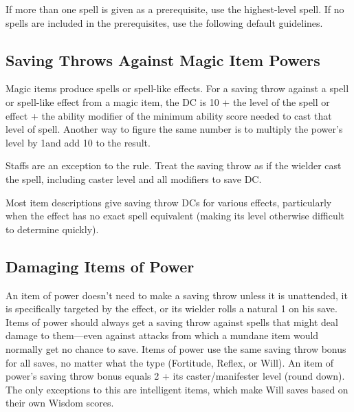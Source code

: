 If more than one spell is given as a prerequisite, use the highest-level spell. If no spells are included in the prerequisites, use the following default guidelines.






\subsection{Saving Throws Against Magic Item Powers}
Magic items produce spells or spell-like effects. For a saving throw against a spell or spell-like effect from a magic item, the DC is 10 + the level of the spell or effect + the ability modifier of the minimum ability score needed to cast that level of spell. Another way to figure the same number is to multiply the power's level by 1\onehalf and add 10 to the result.

Staffs are an exception to the rule. Treat the saving throw as if the wielder cast the spell, including caster level and all modifiers to save DC.

Most item descriptions give saving throw DCs for various effects, particularly when the effect has no exact spell equivalent (making its level otherwise difficult to determine quickly).

\subsection{Damaging Items of Power}
An item of power doesn't need to make a saving throw unless it is unattended, it is specifically targeted by the effect, or its wielder rolls a natural 1 on his save. Items of power should always get a saving throw against spells that might deal damage to them---even against attacks from which a mundane item would normally get no chance to save. Items of power use the same saving throw bonus for all saves, no matter what the type (Fortitude, Reflex, or Will). An item of power's saving throw bonus equals 2 + \onehalf its caster/manifester level (round down). The only exceptions to this are intelligent items, which make Will saves based on their own Wisdom scores.

